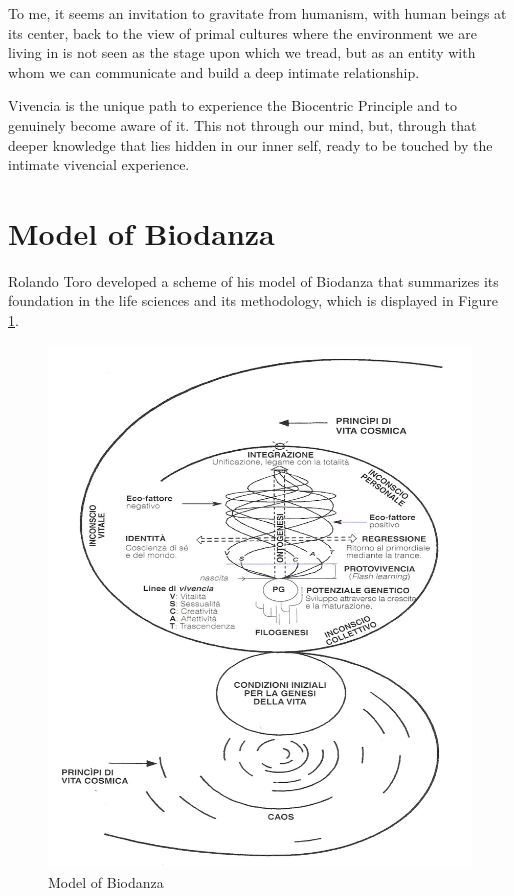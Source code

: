 \documentclass[
  11pt,
]{book}
\begin{document}
To me, it seems an invitation to gravitate from humanism, with human beings at its center, back to the view of primal cultures where the environment we are living in is not seen as the stage upon which we tread, but as an entity with whom we can communicate and build a deep intimate relationship.

Vivencia is the unique path to experience the Biocentric Principle and to genuinely become aware of it. This not through our mind, but, through that deeper knowledge that lies hidden in our inner self, ready to be touched by the intimate vivencial experience.

\hypertarget{sectionModelOfBiodanza}{%
\section{Model of Biodanza}\label{sectionModelOfBiodanza}}

Rolando Toro developed a scheme of his model of Biodanza that summarizes its foundation in the life sciences and its methodology, which is displayed in Figure \ref{fig:model}.

\begin{figure}

{\centering \includegraphics[width=1\linewidth]{./figs/biodanzaModel} 

}

\caption{Model of Biodanza}\label{fig:model}
\end{figure}
\end{document}
